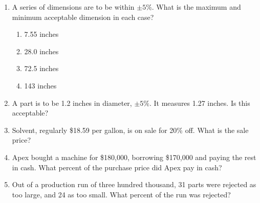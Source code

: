 \documentclass[12pt]{article}
\begin{document}
\begin{enumerate}
\pagebreak

\item A series of dimensions are to be within $\pm5\%$. What is the maximum and minimum acceptable dimension in each case? 
    \begin{enumerate}
	\item 7.55 inches
  \vspace{0.250in}
	\item 28.0 inches
  \vspace{0.250in}
	\item 72.5 inches
  \vspace{0.250in}
	\item 143 inches
  \vspace{0.250in}
    \end{enumerate}
  \vspace{0.250in}

\item A part is to be 1.2 inches in diameter, $\pm5\%$. It measures 1.27 inches. Is this acceptable? 
  \vspace{0.50in}

%

%
\item Solvent, regularly \$18.59 per gallon, is on sale for 20\% off. What is the sale price?
  \vspace{0.50in}

\item Apex bought a machine for \$180,000, borrowing \$170,000 and paying the rest in cash. What percent of the purchase price did Apex pay in cash?
  \vspace{0.50in}

\item Out of a production run of three hundred thousand, 31 parts were rejected as too large, and 24 as too small. What percent of the run was rejected? 
  \vspace{0.50in}


\end{enumerate}
\end{document}
